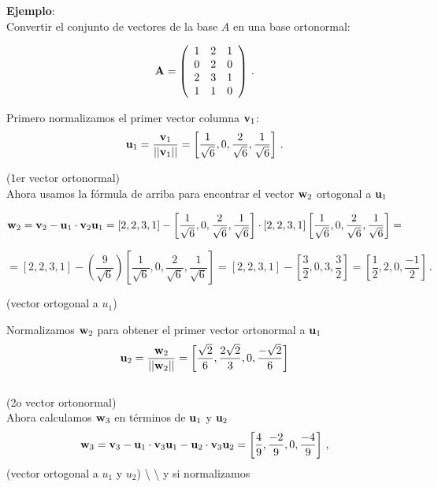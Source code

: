 \documentclass[
]{agujournal2019}
\begin{document}
\textbf{Ejemplo}:\\

Convertir el conjunto de vectores de la base \(A\) en una base
ortonormal:

\[{\textbf A}=\left(\begin{array}{cccc}
  1 & 2 & 1\\
  0 & 2 & 0\\
  2 & 3 & 1\\
  1 & 1 & 0\\
\end{array}
  \right)
\,.\]

Primero normalizamos el primer vector columna \({\textbf v}_1\):
\[{\textbf u}_1=\frac{{\textbf v}_1}{||{\textbf v}_1||}=\left[\frac{1}{\sqrt{6}},0,\frac{2}{\sqrt{6}},\frac{1}{\sqrt{6}}\right]\,.\]

(1er vector ortonormal)\\

Ahora usamos la fórmula de arriba para encontrar el vector
\({\textbf w}_2\) ortogonal a \({\textbf u}_1\)

\[{\textbf w}_2={\textbf v}_2- {\textbf u}_1\cdot{\textbf v}_2{\textbf u}_1=[2,2,3,1]-
   \left[\frac{1}{\sqrt{6}},0,\frac{2}{\sqrt{6}},\frac{1}{\sqrt{6}}\right]\cdot
   [2,2,3,1]\left[\frac{1}{\sqrt{6}},0,\frac{2}{\sqrt{6}},\frac{1}{\sqrt{6}}\right]=\]

\[=[2,2,3,1]-\left(\frac{9}{\sqrt{6}}\right)\left[\frac{1}{\sqrt{6}},0,\frac{2}{\sqrt{6}},\frac{1}{\sqrt{6}}\right]=
   [2,2,3,1]-\left[\frac{3}{2},0,3,\frac{3}{2}\right]=\left[ \frac{1}{2},2,0,\frac{-1}{2}\right]\,.\]

(vector ortogonal a \(u_1\))

Normalizamos \({\textbf w}_2\) para obtener el primer vector ortonormal
a \({\textbf u}_1\)
\[{\textbf u}_2=\frac{{\textbf w}_2}{||{\textbf w}_2||}=\left[ \frac{\sqrt{2}}{6},\frac{2\sqrt{2}}{3},0,\frac{-\sqrt{2}}{6}\right]\]\\

(2o vector ortonormal)\\

Ahora calculamos \({\textbf w}_3\) en términos de \({\textbf u}_1\) y
\({\textbf u}_2\)
\[{\textbf w}_3=  {\textbf v}_3- {\textbf u}_1\cdot{\textbf v}_3{\textbf u}_1 - {\textbf u}_2\cdot{\textbf v}_3{\textbf u}_2=
  \left[ \frac{4}{9},\frac{-2}{9},0,\frac{-4}{9}\right]\,,\] (vector
ortogonal a \(u_1\) y \(u_2\)) \textbackslash{} \textbackslash{} y si
normalizamos\\
\end{document}
